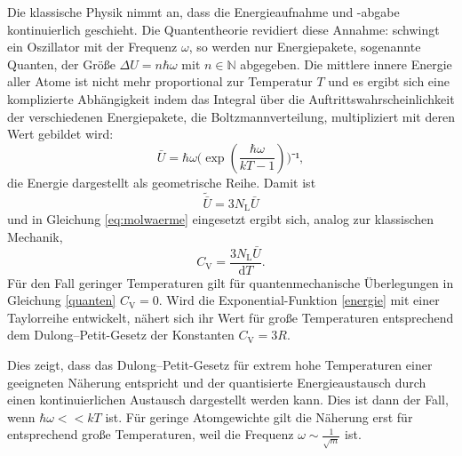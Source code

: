 Die klassische Physik nimmt an, dass die Energieaufnahme und -abgabe kontinuierlich geschieht.
Die Quantentheorie revidiert diese Annahme: 
schwingt ein Oszillator mit der Frequenz $\omega$, so werden nur Energiepakete, sogenannte Quanten, der Größe $\Delta{U}=n \hbar \omega$ mit $n\in\mathbb{N} $ abgegeben.
Die mittlere innere Energie aller Atome ist nicht mehr proportional zur Temperatur $T$ und es ergibt sich eine komplizierte Abhängigkeit indem das Integral über die Auftrittswahrscheinlichkeit der verschiedenen Energiepakete, die Boltzmannverteilung, multipliziert mit deren Wert gebildet wird:
\begin{equation}
	{\bar{U}=\hbar\omega(\exp(\frac{\hbar\omega}{kT-1})})⁻¹,
	\label{energie}
\end{equation}
die Energie dargestellt als geometrische Reihe.
Damit ist
\begin{equation}
	\tilde{{\bar{U}}}=3N_\mathup{L}\bar{U}
\end{equation}
und in Gleichung \eqref{eq:molwaerme} eingesetzt ergibt sich, analog zur klassischen Mechanik,    
\begin{equation}
	C_\mathup{V}=\frac{3N_\mathup{L}\bar{U}}{\mathup{d}T}.
	\label{quanten}
\end{equation}
Für den Fall geringer Temperaturen gilt für quantenmechanische Überlegungen in Gleichung \eqref{quanten} $C_\mathup{V}=0$. 
Wird die Exponential-Funktion \eqref{energie} mit einer Taylorreihe entwickelt, nähert sich ihr Wert für große Temperaturen entsprechend dem Dulong--Petit-Gesetz der Konstanten $C_\mathup{V}=3R$.

Dies zeigt, dass das Dulong--Petit-Gesetz für extrem hohe Temperaturen einer geeigneten Näherung entspricht und der quantisierte Energieaustausch durch einen kontinuierlichen Austausch dargestellt werden kann. 
Dies ist dann der Fall, wenn $\hbar\omega<<kT$ ist. 
Für geringe Atomgewichte gilt die Näherung erst für entsprechend große Temperaturen, weil die Frequenz $\omega\sim\frac{1}{\sqrt{m}}$ ist.


